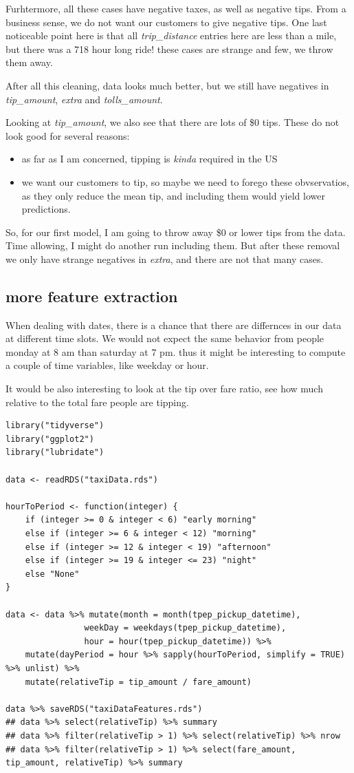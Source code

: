 \documentclass[11pt]{article}
\begin{document}
Furhtermore, all these cases have negative taxes, as well as negative tips. From a business
sense, we do not want our customers to give negative tips. One last noticeable point here
is that all \emph{trip\_distance} entries here are less than a mile, but there was a 718 hour long
ride! these cases are strange and few, we throw them away.

After all this cleaning, data looks much better, but we still have negatives in \emph{tip\_amount},
\emph{extra} and \emph{tolls\_amount}.

Looking at \emph{tip\_amount}, we also see that there are lots of \$0 tips. These do not look good
for several reasons:
\begin{itemize}
\item as far as I am concerned, tipping is \emph{kinda} required in the US
\item we want our customers to tip, so maybe we need to forego these obvservatios, as they only
reduce the mean tip, and including them would yield lower predictions.
\end{itemize}
So, for our first model, I am going to throw away \$0 or lower tips from the data. Time
allowing, I might do another run including them. But after these removal we only have
strange negatives in \emph{extra}, and there are not that many cases.


\subsection{more feature extraction}
\label{sec:org8cfd14f}
When dealing with dates, there is a chance that there are differnces in our data
at different time slots. We would not expect the same behavior from people
monday at 8 am than saturday at 7 pm. thus it might be interesting to compute
a couple of time variables, like weekday or hour.

It would be also interesting to look at the tip over fare ratio, see how much
relative to the total fare people are tipping. 

\begin{verbatim}
library("tidyverse")
library("ggplot2")
library("lubridate")

data <- readRDS("taxiData.rds")

hourToPeriod <- function(integer) {
    if (integer >= 0 & integer < 6) "early morning"
    else if (integer >= 6 & integer < 12) "morning"
    else if (integer >= 12 & integer < 19) "afternoon"
    else if (integer >= 19 & integer <= 23) "night"
    else "None"
}

data <- data %>% mutate(month = month(tpep_pickup_datetime),
                weekDay = weekdays(tpep_pickup_datetime),
                hour = hour(tpep_pickup_datetime)) %>%
    mutate(dayPeriod = hour %>% sapply(hourToPeriod, simplify = TRUE) %>% unlist) %>%
    mutate(relativeTip = tip_amount / fare_amount)

data %>% saveRDS("taxiDataFeatures.rds")
## data %>% select(relativeTip) %>% summary
## data %>% filter(relativeTip > 1) %>% select(relativeTip) %>% nrow
## data %>% filter(relativeTip > 1) %>% select(fare_amount, tip_amount, relativeTip) %>% summary


\end{verbatim}
\end{document}
